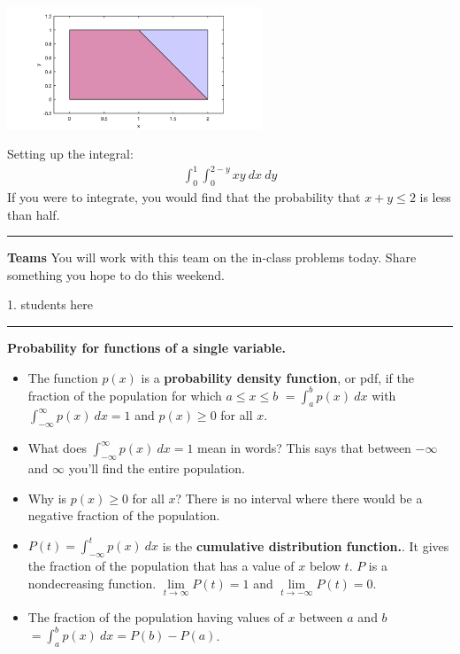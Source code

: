 \documentclass[12pt,letterpaper,noanswers]{exam}
\begin{document}
\includegraphics[width=3in]{img/C15skillcheck.png}

Setting up the integral:
\begin{align*}
   \int_0^1 \int_0^{2-y}xy\ dx\ dy
\end{align*}
If you were to integrate, you would find that the probability that $x+y\leq 2$ is less than half.

\vspace{0.2cm}
\hrule
\vspace{0.2cm}

\noindent\textbf{Teams}
You will work with this team on the in-class problems today.  Share something you hope to do this weekend.
\begin{multicols}{2}
1.  students here

\end{multicols}

\hrule
\vspace{0.2cm}

\eject


\noindent\textbf{Probability for functions of a single variable.}
\begin{tcolorbox}
\begin{itemize}
\itemsep0em
    \item The function $p(x)$ is a \textbf{probability density function}, or pdf, if the fraction of the population for which $a\leq x\leq b$ $\displaystyle= \int_a^b p(x)\ dx$ with $\displaystyle\int_{-\infty}^{\infty}p(x)\ dx = 1$ and $p(x)\geq 0$ for all $x$.
    \item What does $\displaystyle\int_{-\infty}^{\infty}p(x)\ dx = 1$ mean in words?  This says that between $-\infty$ and $\infty$ you'll find the entire population.
    \item Why is $p(x)\geq 0$ for all $x$?  There is no interval where there would be a negative fraction of the population.
    \item $\displaystyle P(t) = \int_{-\infty}^t p(x)\ dx$ is the \textbf{cumulative distribution function.}. It gives the fraction of the population that has a value of $x$ below $t$.  $P$ is a nondecreasing function.  $\lim\limits_{t\rightarrow\infty} P(t) = 1$ and $\lim\limits_{t\rightarrow -\infty} P(t) = 0$.
    \item The fraction of the population having values of $x$ between $a$ and $b$ $\displaystyle= \int_a^b p(x)\ dx = P(b)-P(a)$.
\end{itemize}
\end{tcolorbox}
\end{document}
